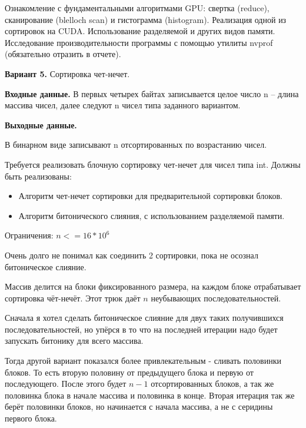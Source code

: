 \documentclass[12pt]{article}
\begin{document}


Ознакомление с фундаментальными алгоритмами GPU: свертка
(reduce), сканирование (blelloch scan) и гистограмма (histogram). Реализация одной из
сортировок на CUDA. Использование разделяемой и других видов памяти.
Исследование производительности программы с помощью утилиты nvprof
(обязательно отразить в отчете).

\textbf{Вариант 5.} Сортировка чет-нечет.

\textbf{Входные данные.}
В первых четырех байтах записывается целое число n --
длина массива чисел, далее следуют n чисел типа заданного вариантом.

\textbf{Выходные данные.}

В бинарном виде записывают n отсортированных по
возрастанию чисел.


Требуется реализовать блочную сортировку чет-нечет для чисел типа int.
Должны быть реализованы:

\begin{itemize}
	\item Алгоритм чет-нечет сортировки для предварительной сортировки
	      блоков.
	\item Алгоритм битонического слияния, с использованием разделяемой
	      памяти.
\end{itemize}

Ограничения: $n <= 16 * 10^6$

\nvidia


Очень долго не понимал как соединить 2 сортировки, пока не осознал битоническое слияние.

Массив делится на блоки фиксированного размера, на каждом блоке отрабатывает сортировка чёт-нечёт.
Этот трюк даёт $n$ неубывающих последовательностей.

Сначала я хотел сделать битоническое слияние для двух таких получившихся последовательностей,
но упёрся в то что на последней итерации надо будет запускать битонику для всего массива.

Тогда другой вариант показался более привлекательным - сливать половинки блоков.
То есть вторую половину от предыдущего блока и первую от последующего.
После этого будет $n-1$ отсортированных блоков, а так же половинка блока в начале массива и половинка в конце.
Вторая итерация так же берёт половинки блоков, но начинается с начала массива, а не с серидины первого блока.
\end{document}
